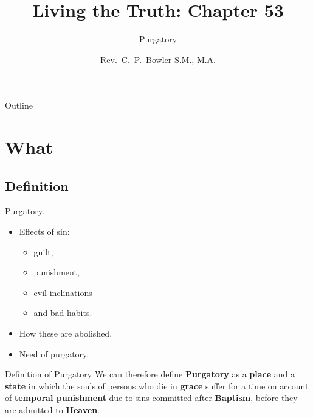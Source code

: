 \documentclass{beamer}
\title[Living the Truth 53] %
{Living the Truth: Chapter 53}
\subtitle
{Purgatory} %
\author{Rev.~C.~P.~Bowler S.M., M.A.}
\begin{document}
\begin{frame}
  \titlepage
\end{frame}

\begin{frame}{Outline}
  \tableofcontents
\end{frame}





\section{What}

\subsection{Definition}

\begin{frame}{Purgatory.}
\begin{itemize}
 \item Effects of sin:
\begin{itemize}
\item guilt,
\item punishment,
\item evil inclinations
\item and bad habits.
\end{itemize}
 \item How these are abolished.
 \item Need of purgatory.
\end{itemize}
\end{frame}

\begin{frame}{Definition of Purgatory}
We can therefore define \textbf{Purgatory} as a \textbf{place} and a \textbf{state} in which the  souls
of persons who die in \textbf{grace}  suffer  for  a  time  on  account  of  \textbf{temporal
punishment} due to sins committed after \textbf{Baptism}, before they are admitted  to
\textbf{Heaven}.
\end{frame}
\end{document}
